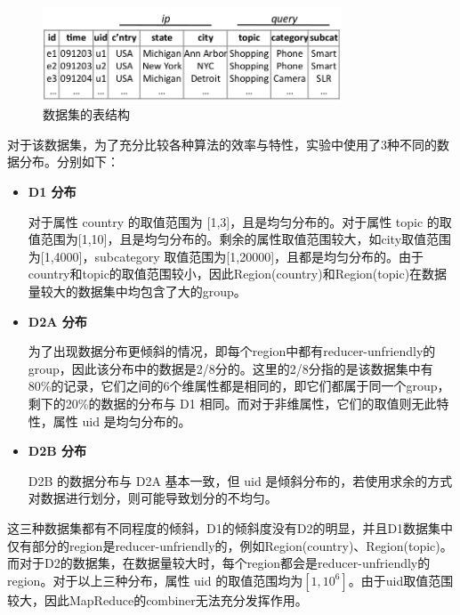 \begin{figure}[!htb]
\centering\includegraphics[width=3.5in]{picture/ch_datacube_mr/dataset_table} 
\caption{数据集的表结构}\label{dataset_table} 
\end{figure} 


对于该数据集，为了充分比较各种算法的效率与特性，实验中使用了3种不同的数据分布。分别如下：
\begin{itemize}

\item \textbf{D1 分布}

对于属性 country 的取值范围为 [1,3]，且是均匀分布的。对于属性 topic 的取值范围为[1,10]，且是均匀分布的。剩余的属性取值范围较大，如city取值范围为[1,4000]，subcategory 取值范围为[1,20000]，且都是均匀分布的。由于country和topic的取值范围较小，因此Region(country)和Region(topic)在数据量较大的数据集中均包含了大的group。

\item \textbf{D2A 分布}

为了出现数据分布更倾斜的情况，即每个region中都有reducer-unfriendly的group，因此该分布中的数据是2/8分的。这里的2/8分指的是该数据集中有80\%的记录，它们之间的6个维属性都是相同的，即它们都属于同一个group，剩下的20\%的数据的分布与 D1 相同。而对于非维属性，它们的取值则无此特性，属性 uid 是均匀分布的。

\item \textbf{D2B 分布}

D2B 的数据分布与 D2A 基本一致，但 uid 是倾斜分布的，若使用求余的方式对数据进行划分，则可能导致划分的不均匀。

\end{itemize}

这三种数据集都有不同程度的倾斜，D1的倾斜度没有D2的明显，并且D1数据集中仅有部分的region是reducer-unfriendly的，例如Region(country)、Region(topic)。而对于D2的数据集，在数据量较大时，每个region都会是reducer-unfriendly的region。对于以上三种分布，属性 uid 的取值范围均为$[1,{10}^{6}]$。由于uid取值范围较大，因此MapReduce的combiner无法充分发挥作用。

